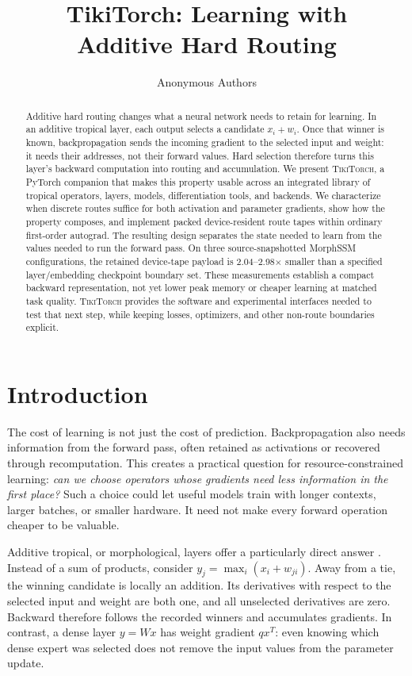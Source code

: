 \documentclass{article}
\title{TikiTorch: Learning with\\Additive Hard Routing}
\author{Anonymous Authors}
\theoremstyle{plain}
\theoremstyle{definition}
\theoremstyle{remark}
\newcommand{\ttorch}{\textsc{TikiTorch}}
\begin{document}
\maketitle

\begin{abstract}
Additive hard routing changes what a neural network needs to retain for
learning. In an additive tropical layer, each output selects a candidate
$x_i+w_i$. Once that winner is known, backpropagation sends the incoming
gradient to the selected input and weight: it needs their addresses, not
their forward values. Hard selection therefore turns this layer's backward
computation into routing and accumulation. We present \ttorch{}, a PyTorch
companion that makes this property usable across an integrated library of
tropical operators, layers, models, differentiation tools, and backends.
We characterize when discrete routes suffice for both activation and
parameter gradients, show how the property composes, and implement packed
device-resident route tapes within ordinary first-order autograd.
The resulting design separates the state needed to learn from the values
needed to run the forward pass. On three source-snapshotted MorphSSM
configurations, the retained device-tape payload is
2.04--2.98$\times$ smaller than a specified layer/embedding checkpoint
boundary set. These measurements establish a compact backward representation,
not yet lower peak memory or cheaper learning at matched task quality.
\ttorch{} provides the software and experimental interfaces needed to test
that next step, while keeping losses, optimizers, and other non-route
boundaries explicit.
\end{abstract}

\section{Introduction}

The cost of learning is not just the cost of prediction. Backpropagation
also needs information from the forward pass, often retained as activations
or recovered through recomputation. This creates a practical question for
resource-constrained learning: \emph{can we choose operators whose gradients
need less information in the first place?} Such a choice could let useful
models train with longer contexts, larger batches, or smaller hardware.
It need not make every forward operation cheaper to be valuable.

Additive tropical, or morphological, layers offer a particularly direct
answer \citep{ritter1996morphological,franchi2020morphological}. Instead of a
sum of products, consider $y_j=\max_i(x_i+w_{ji})$. Away from a tie, the
winning candidate is locally an addition. Its derivatives with respect to
the selected input and weight are both one, and all unselected derivatives
are zero. Backward therefore follows the recorded winners and accumulates
gradients. In contrast, a dense layer $y=Wx$ has weight gradient $qx^T$:
even knowing which dense expert was selected does not remove the input
values from the parameter update.
\end{document}
